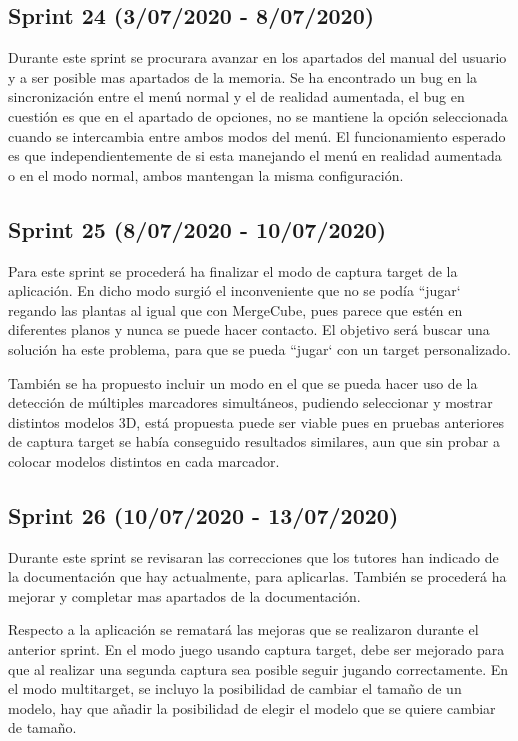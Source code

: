 \subsection{Sprint 24 (3/07/2020 - 8/07/2020)} 
 Durante este sprint se procurara avanzar en los apartados del manual del usuario y a ser posible mas apartados de la memoria.
 Se ha encontrado un bug en la sincronización entre el menú normal y el de realidad aumentada, el bug en cuestión es que en el apartado de opciones, no se mantiene la opción seleccionada cuando se intercambia entre ambos modos del menú. El funcionamiento esperado es que independientemente de si esta manejando el menú en realidad aumentada o en el modo normal, ambos mantengan la misma configuración.
 
 \subsection{Sprint 25 (8/07/2020 - 10/07/2020)} 
 Para este sprint se procederá ha finalizar el modo de captura target de la aplicación. En dicho modo surgió el inconveniente que no se podía ``jugar` regando las plantas al igual que con  MergeCube, pues parece que estén en diferentes planos y nunca se puede hacer contacto. El objetivo será buscar una solución ha este problema, para que se pueda ``jugar`  con un target personalizado. 
 
 También se ha propuesto incluir un modo en el que se pueda hacer uso de la detección de múltiples marcadores simultáneos, pudiendo seleccionar y mostrar distintos modelos 3D, está propuesta puede ser viable pues en pruebas anteriores de captura target se había conseguido resultados similares, aun que sin probar a colocar modelos distintos en cada marcador.

 \subsection{Sprint 26 (10/07/2020 - 13/07/2020)} 
 Durante este sprint se revisaran las correcciones que los tutores han  indicado de la documentación que hay actualmente, para aplicarlas. También se procederá ha mejorar y completar mas apartados de la documentación.
 
 Respecto a la aplicación se rematará las mejoras que se realizaron durante el anterior sprint. En el modo juego usando captura target, debe ser mejorado para que al realizar una segunda captura sea posible seguir jugando correctamente. En el modo multitarget, se incluyo la posibilidad de cambiar el tamaño de un modelo, hay que añadir la posibilidad de elegir el modelo que se quiere cambiar de tamaño. 
 

